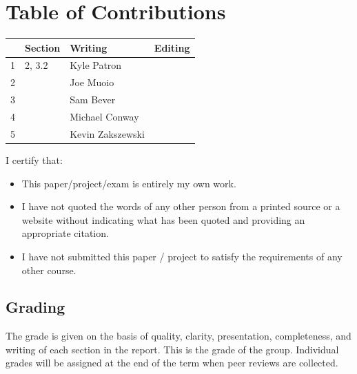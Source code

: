 \documentclass{article}
\begin{document}

\newpage

\section*{\centering Table of Contributions}
\begin{tabular}{| l | l | l | l |}
    \hline
     & Section & Writing & Editing \\
    \hline \hline
		1 & 2, 3.2 & Kyle Patron & \\ \hline
		2 & & Joe Muoio & \\ \hline
		3 & & Sam Bever & \\ \hline
		4 & & Michael Conway &  \\ \hline
		5 & & Kevin Zakszewski &  \\ \hline
\end{tabular}
\newpage
\noindent I certify that:
\begin{itemize}
\item This paper/project/exam is entirely my own work.
\item I have not quoted the words of any other person from a printed source or a website without indicating what has been quoted and providing an appropriate citation.
\item I have not submitted this paper / project to satisfy the requirements of any other course.
\end{itemize}

\vspace{1cm}
\noindent{}


\vspace{0.5cm}
\noindent{}

\vspace{0.5cm}
\noindent{}

\vspace{0.5cm}
\noindent{}

\vspace{0.5cm}
\noindent{}

\vspace{\fill}
\subsection*{Grading}
The grade is given on the basis of quality, clarity, presentation, completeness, and writing of each section in the report. This is the grade of the group. Individual grades will be assigned at the end of the term when peer reviews are collected.
\end{document}
